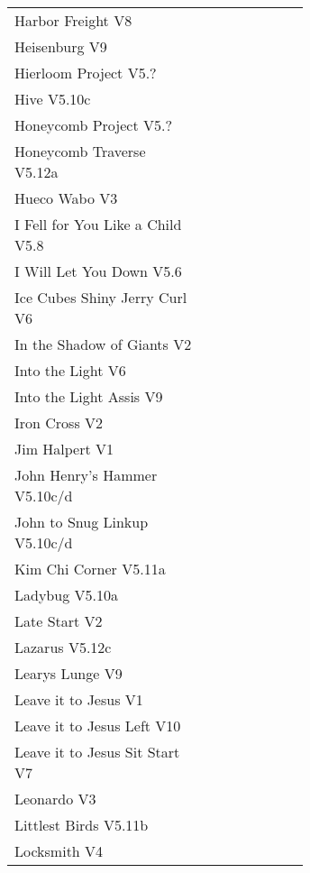 \begin{flushleft}
\begin{center}
\begin{supertabular}{p{0.65\linewidth}r}
Harbor Freight V8 & \pageref{vr:Harbor Freight} \\
Heisenburg V9 & \pageref{rt:Heisenburg} \\
Hierloom Project V5.? & \pageref{rt:Hierloom Project} \\
Hive V5.10c & \pageref{rt:Hive} \\
Honeycomb Project V5.? & \pageref{rt:Honeycomb Project} \\
Honeycomb Traverse V5.12a & \pageref{vr:Honeycomb Traverse} \\
Hueco Wabo V3 & \pageref{rt:Hueco Wabo} \\
I Fell for You Like a Child V5.8 & \pageref{rt:I Fell for You Like a Child} \\
I Will Let You Down V5.6 & \pageref{rt:I Will Let You Down} \\
Ice Cubes Shiny Jerry Curl V6 & \pageref{rt:Ice Cubes Shiny Jerry Curl} \\
In the Shadow of Giants V2 & \pageref{rt:In the Shadow of Giants} \\
Into the Light V6 & \pageref{rt:Into the Light} \\
Into the Light Assis V9 & \pageref{vr:Into the Light Assis} \\
Iron Cross V2 & \pageref{vr:Iron Cross} \\
Jim Halpert V1 & \pageref{rt:Jim Halpert} \\
John Henry's Hammer V5.10c/d & \pageref{rt:John Henry's Hammer} \\
John to Snug Linkup V5.10c/d & \pageref{vr:John to Snug Linkup} \\
Kim Chi Corner V5.11a & \pageref{rt:Kim Chi Corner} \\
Ladybug V5.10a & \pageref{rt:Ladybug} \\
Late Start V2 & \pageref{vr:Late Start} \\
Lazarus V5.12c & \pageref{vr:Lazarus} \\
Learys Lunge V9 & \pageref{vr:Learys Lunge} \\
Leave it to Jesus V1 & \pageref{rt:Leave it to Jesus} \\
Leave it to Jesus Left V10 & \pageref{vr:Leave it to Jesus Left} \\
Leave it to Jesus Sit Start V7 & \pageref{vr:Leave it to Jesus Sit Start} \\
Leonardo V3 & \pageref{rt:Leonardo} \\
Littlest Birds V5.11b & \pageref{rt:Littlest Birds} \\
Locksmith V4 & \pageref{rt:Locksmith} \\

\end{supertabular}
\end{center}
\end{flushleft}
